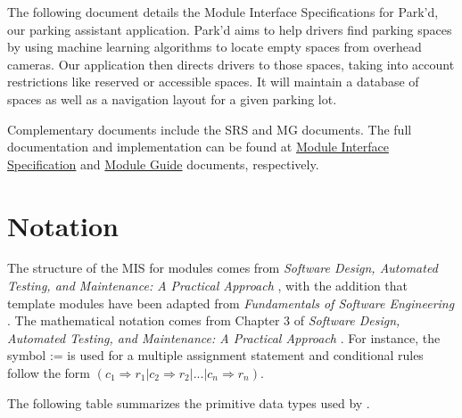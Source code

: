 \documentclass[12pt, titlepage]{article}
\begin{document}
The following document details the Module Interface Specifications for Park'd,
our parking assistant application. Park'd aims to help drivers find parking
spaces by using machine learning algorithms to locate empty spaces from overhead
cameras. Our application then directs drivers to those spaces, taking into
account restrictions like reserved or accessible spaces. It will maintain a
database of spaces as well as a navigation layout for a given parking lot.

Complementary documents include the SRS and MG documents. The full documentation
and implementation can be found at
\href{https://github.com/parkd-app/park-d/blob/main/docs/Design/SoftDetailedDes/MIS.pdf}{Module
Interface Specification} and
\href{https://github.com/parkd-app/park-d/blob/main/docs/Design/SoftArchitecture/MG.pdf}{Module
Guide} documents, respectively.

\section{Notation}

The structure of the MIS for modules comes from \emph{Software Design, Automated
Testing, and Maintenance: A Practical Approach} \cite{HoffmanAndStrooper1995},
with the addition that template modules have been adapted from
\emph{Fundamentals of Software Engineering} \cite{GhezziEtAl2003}.  The
mathematical notation comes from Chapter 3 of \emph{Software Design, Automated
Testing, and Maintenance: A Practical Approach} \cite{HoffmanAndStrooper1995}.
For instance, the symbol := is used for a multiple assignment statement and
conditional rules follow the form $(c_1 \Rightarrow r_1 | c_2 \Rightarrow r_2 |
... | c_n \Rightarrow r_n )$.

\newpage
The following table summarizes the primitive data types used by \progname. 
\end{document}
